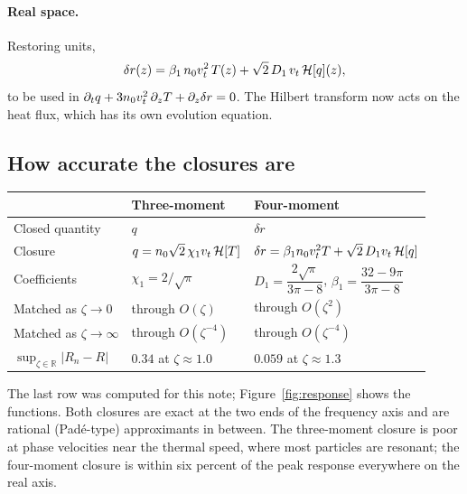\paragraph{Real space.} Restoring units,
\begin{equation}
  \delta r(z)=\beta_1\,n_0v_t^2\,T(z)+\sqrt2\,D_1\,v_t\,\mathcal{H}[q](z),
\end{equation}
to be used in
$\partial_tq+3n_0v_t^2\,\partial_zT+\partial_z\delta r=0$. The Hilbert
transform now acts on the heat flux, which has its own evolution equation.

\subsection{How accurate the closures are}

\begin{center}
\renewcommand{\arraystretch}{1.5}
\begin{tabular}{lll}
\toprule
  & Three-moment & Four-moment \\
\midrule
  Closed quantity & $q$ & $\delta r$ \\
  Closure & $q=n_0\sqrt2\,\chi_1v_t\,\mathcal{H}[T]$
          & $\delta r=\beta_1n_0v_t^2T+\sqrt2\,D_1v_t\,\mathcal{H}[q]$ \\
  Coefficients & $\chi_1=2/\sqrt\pi$
          & $D_1=\dfrac{2\sqrt\pi}{3\pi-8}$,\;
            $\beta_1=\dfrac{32-9\pi}{3\pi-8}$ \\
  Matched as $\zeta\to0$ & through $O(\zeta)$ & through $O(\zeta^2)$ \\
  Matched as $\zeta\to\infty$ & through $O(\zeta^{-4})$
          & through $O(\zeta^{-4})$ \\
  $\sup_{\zeta\in\mathbb R}|R_n-R|$ & $0.34$ at $\zeta\approx1.0$
          & $0.059$ at $\zeta\approx1.3$ \\
\bottomrule
\end{tabular}
\end{center}
The last row was computed for this note; Figure~\ref{fig:response} shows
the functions. Both closures are exact at the two ends of the frequency
axis and are rational (Pad\'e-type) approximants in between. The
three-moment closure is poor at phase velocities near the thermal speed,
where most particles are resonant; the four-moment closure is within six
percent of the peak response everywhere on the real axis.

